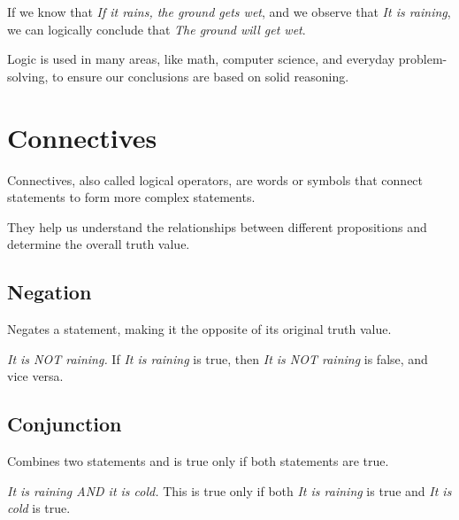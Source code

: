 \documentclass{article}
\theoremstyle{mytheoremstyle}
\theoremstyle{mytheoremstyle}
\theoremstyle{myexamplestyle}
\begin{document}
\begin{example}
    If we know that \emph{If it rains, the ground gets wet}, and we
    observe that \emph{It is raining}, we can logically conclude
    that \emph{The ground will get wet}.
\end{example}

Logic is used in many areas, like math, computer science, and everyday problem-solving, to ensure our conclusions are based on solid reasoning.

\section{Connectives}

\begin{definition}
    Connectives, also called logical operators, are words or symbols
    that connect statements to form more complex statements.
\end{definition}
They help us understand the relationships between different propositions and determine the overall truth value.


\subsection{Negation}

\begin{definition}
    Negates a statement, making it the opposite of its original truth value.
\end{definition}

\begin{example}
    \emph{It is NOT raining.} If \emph{It is raining} is true, then \emph{It is NOT raining} is false, and vice versa.
\end{example}

\subsection{Conjunction}
\begin{definition}
    Combines two statements and is true only if both statements are
    true.
\end{definition}

\begin{example}
    \emph{It is raining AND it is cold.} This is true only if both \emph{It is raining} is true and \emph{It is cold} is true.
\end{example}

\newpage
\end{document}
